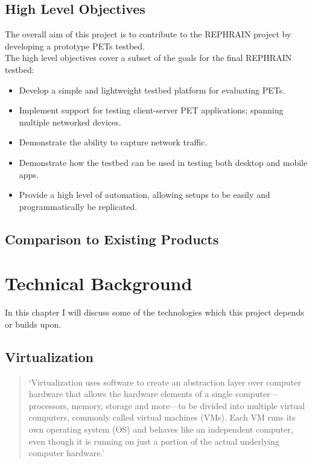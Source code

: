 \documentclass[
    author={Jacob Daniel Halsey},
    supervisor={Prof. Awais Rashid},
    degree={BSc},
    title={Building a Testbed for Evaluating Privacy Enhancing Technologies  (PETs)},
    subtitle={},
    type={software development},
    year={2021}
]{dissertation}
\begin{document}
\section{High Level Objectives}
\label{sect:objectives}

The overall aim of this project is to contribute to the REPHRAIN project
by developing a prototype PETs testbed. \\

The high level objectives cover a subset of the goals for the final REPHRAIN testbed:

\begin{itemize}
	\item Develop a simple and lightweight testbed platform for evaluating PETs.
	\item Implement support for testing client-server PET applications; spanning multiple
	networked devices.
	\item Demonstrate the ability to capture network traffic.
	\item Demonstrate how the testbed can be used in testing both desktop and mobile apps.
	\item Provide a high level of automation, allowing setups to be easily 
	and programmatically be replicated.
\end{itemize}

\section{Comparison to Existing Products}


\chapter{Technical Background}
\label{chap:technical}

In this chapter I will discuss some of the technologies which this project depends or builds upon.

\section{Virtualization}

\begin{quotation}
	`Virtualization uses software to create an abstraction layer over computer hardware that allows the hardware 
	elements of a single computer—processors, memory, storage and more—to be divided into multiple virtual computers, 
	commonly called virtual machines (VMs). Each VM runs its own operating system (OS) and behaves like an independent 
	computer, even though it is running on just a portion of the actual underlying computer hardware.'~\cite{ibm_virtualization}
\end{quotation}
\end{document}
